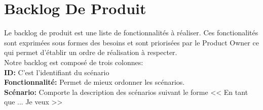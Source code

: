 \section{Backlog De Produit}
\noindent
\large
Le backlog de produit est une liste de fonctionnalités à réaliser. Ces fonctionalités sont exprimées sous formes des besoins et sont priorisées par le Product Owner ce qui permet d'établir un ordre de réalisation à respecter. \\
Notre backlog est composé de trois colonnes: \\
\textbf{ID: } C'est l'identifiant du scénario \\
\textbf{Fonctionnalité: } Permet de mieux ordonner les scénarios. \\
\textbf{Scénario: } Comporte la description des scénarios suivant le forme << En tant que ... Je veux >> \\

